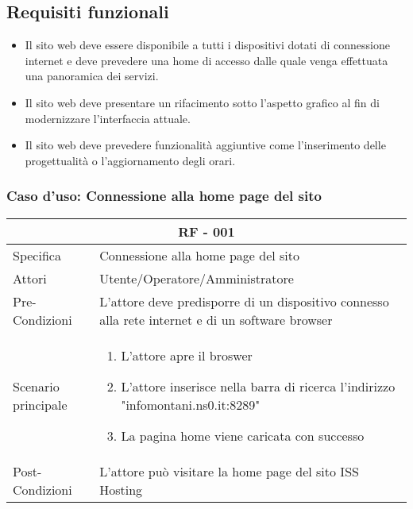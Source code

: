 \documentclass{article}
\begin{document}
	\subsection{\textbf{Requisiti funzionali}}
	\begin{itemize}
		\item Il sito web deve essere disponibile a tutti i dispositivi dotati di connessione internet e deve prevedere una home di accesso dalle quale venga effettuata una panoramica dei servizi.
		\item Il sito web deve presentare un rifacimento sotto l'aspetto grafico al fin di modernizzare l'interfaccia attuale.
		\item Il sito web deve prevedere funzionalità aggiuntive come l'inserimento delle progettualità o l'aggiornamento degli orari.
	\end{itemize}
	
	\subsubsection{\textbf{Caso d'uso: Connessione alla home page del sito}}
\begin{tabular}{ |p{3cm}|p{8cm}|  }
	\hline
	\multicolumn{2}{|c|}{\textbf{RF - 001}} \\
	\hline
	Specifica& Connessione alla home page del sito\\
	\hline
	Attori& Utente/Operatore/Amministratore\\
	\hline
	Pre-Condizioni& L'attore deve predisporre di un dispositivo connesso alla rete internet e di un software browser\\
	\hline
	Scenario principale& \begin{enumerate}
		\item L'attore apre il broswer
		\item L'attore inserisce nella barra di ricerca l'indirizzo "infomontani.ns0.it:8289"
		\item La pagina home viene caricata con successo
			\end{enumerate}\\
		\hline
	Post-Condizioni& L'attore può visitare la home page del sito ISS Hosting\\
\hline
\end{tabular}
\clearpage
\end{document}
